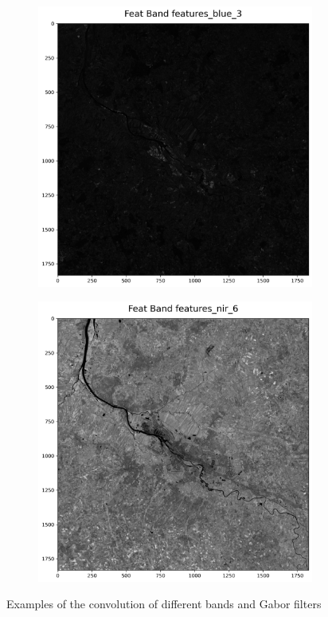 \documentclass[12pt,a4paper, english,twoside]{scrartcl}
\begin{document}
\begin{figure}
        \begin{subfigure}[b]{0.38\textwidth}
          \includegraphics[width=\textwidth]{img/Features_blue3.png}
        \end{subfigure}

        \begin{subfigure}[b]{0.38\textwidth}
          \includegraphics[width=\textwidth]{img/Features_nir_6.png}
        \end{subfigure}
       \caption{Examples of the convolution of different bands and Gabor filters\label{fig:gaborresults}}
       \vspace{-2cm}
      \end{figure} 
\end{document}
